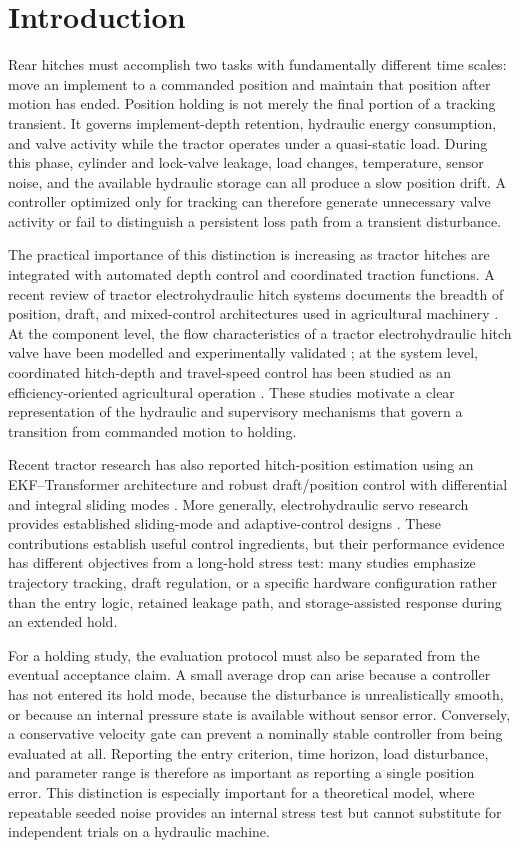 \documentclass[agriengineering,article,submit,moreauthors]{Definitions/mdpi}
\begin{document}
\section{Introduction}
Rear hitches must accomplish two tasks with fundamentally different time scales: move an implement to a commanded position and maintain that position after motion has ended. Position holding is not merely the final portion of a tracking transient. It governs implement-depth retention, hydraulic energy consumption, and valve activity while the tractor operates under a quasi-static load. During this phase, cylinder and lock-valve leakage, load changes, temperature, sensor noise, and the available hydraulic storage can all produce a slow position drift. A controller optimized only for tracking can therefore generate unnecessary valve activity or fail to distinguish a persistent loss path from a transient disturbance.

The practical importance of this distinction is increasing as tractor hitches are integrated with automated depth control and coordinated traction functions. A recent review of tractor electrohydraulic hitch systems documents the breadth of position, draft, and mixed-control architectures used in agricultural machinery \cite{sun2022}. At the component level, the flow characteristics of a tractor electrohydraulic hitch valve have been modelled and experimentally validated \cite{kumar2021}; at the system level, coordinated hitch-depth and travel-speed control has been studied as an efficiency-oriented agricultural operation \cite{sun2025}. These studies motivate a clear representation of the hydraulic and supervisory mechanisms that govern a transition from commanded motion to holding.

Recent tractor research has also reported hitch-position estimation using an EKF--Transformer architecture \cite{kim2025} and robust draft/position control with differential and integral sliding modes \cite{liu2023}. More generally, electrohydraulic servo research provides established sliding-mode and adaptive-control designs \cite{bai2010,tang2011,jin2013}. These contributions establish useful control ingredients, but their performance evidence has different objectives from a long-hold stress test: many studies emphasize trajectory tracking, draft regulation, or a specific hardware configuration rather than the entry logic, retained leakage path, and storage-assisted response during an extended hold.

For a holding study, the evaluation protocol must also be separated from the eventual acceptance claim. A small average drop can arise because a controller has not entered its hold mode, because the disturbance is unrealistically smooth, or because an internal pressure state is available without sensor error. Conversely, a conservative velocity gate can prevent a nominally stable controller from being evaluated at all. Reporting the entry criterion, time horizon, load disturbance, and parameter range is therefore as important as reporting a single position error. This distinction is especially important for a theoretical model, where repeatable seeded noise provides an internal stress test but cannot substitute for independent trials on a hydraulic machine.
\end{document}
